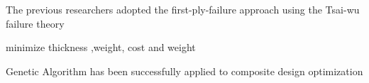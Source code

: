 \documentclass[smallextended]{svjour3}       %
\begin{document}




The previous researchers adopted the first-ply-failure approach using the Tsai-wu failure
theory
\cite{massard1984computer,reddy1987first,fang1993design,soeiro1994multilevel,pelletier2006multi,jadhav2007parametric,omkar2008artificial}

minimize thickness
\cite{abu1998optimum,walker2003technique},weight\cite{fang1993design,deka2005multiobjective,park2008improved},
cost and weight\cite{deka2005multiobjective,omkar2008artificial}

Genetic Algorithm has been successfully applied to composite design
optimization\cite{riche1993optimization,nagendra1996improved,sadagopan1998application,todoroki1998stacking,liu2000permutation,sivakumar1998optimum,walker2003technique,lin2004stacking,kang2005minimum,murugan2007target,akbulut2008optimum}





\end{document}
